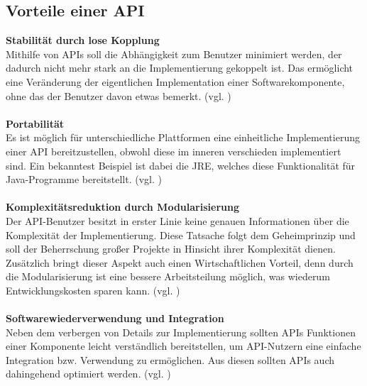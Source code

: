 \subsection{Vorteile einer \gls{API}}
\textbf{Stabilität durch lose Kopplung}\\
Mithilfe von \glspl{API} soll die Abhängigkeit zum Benutzer minimiert werden, der dadurch nicht mehr stark an die Implementierung gekoppelt ist. Das ermöglicht eine Veränderung der eigentlichen Implementation einer Softwarekomponente, ohne das der Benutzer davon etwas bemerkt. (vgl. \cite[9]{apiDesign})\\
\\
\textbf{Portabilität}\\
Es ist möglich für unterschiedliche Plattformen eine einheitliche Implementierung einer \gls{API} bereitzustellen, obwohl diese im inneren verschieden implementiert sind. Ein bekanntest Beispiel ist dabei die \gls{JRE}, welches diese Funktionalität für Java-Programme bereitstellt. (vgl. \cite[9]{apiDesign})\\
\\
\textbf{Komplexitätsreduktion durch Modularisierung}\\
Der \gls{API}-Benutzer besitzt in erster Linie keine genauen Informationen über die Komplexität der Implementierung. Diese Tatsache folgt dem Geheimprinzip und soll der Beherrschung großer Projekte in Hinsicht ihrer Komplexität dienen. Zusätzlich bringt dieser Aspekt auch einen Wirtschaftlichen Vorteil, denn durch die Modularisierung ist eine bessere Arbeitsteilung möglich, was wiederum Entwicklungskosten sparen kann. (vgl. \cite[10]{apiDesign})\\
\\
\textbf{Softwarewiederverwendung und Integration}\\
Neben dem verbergen von Details zur Implementierung sollten \glspl{API} Funktionen einer Komponente leicht verständlich bereitstellen, um \gls{API}-Nutzern eine einfache Integration bzw. Verwendung zu ermöglichen. Aus diesen sollten \glspl{API} auch dahingehend optimiert werden. (vgl. \cite[10]{apiDesign})\\
\\

